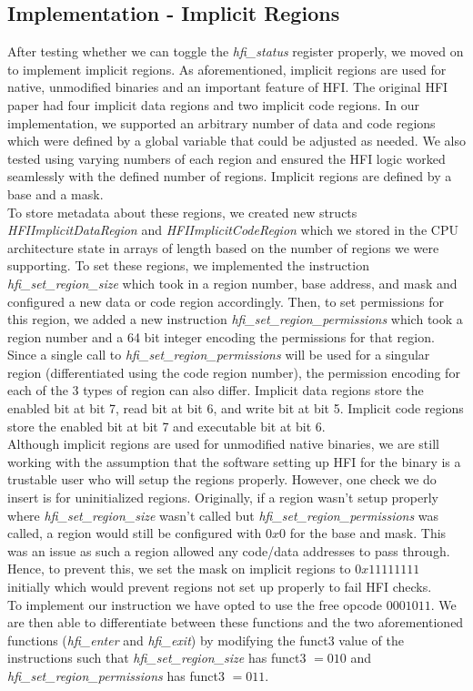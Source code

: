 \documentclass[conference,compsoc]{IEEEtran}
\begin{document}
\subsection{Implementation - Implicit Regions}
After testing whether we can toggle the \textit{hfi\_status} register properly, we moved on to implement implicit regions. As aforementioned, implicit regions are used for native, unmodified binaries and an important feature of HFI. The original HFI paper had four implicit data regions and two implicit code regions. In our implementation, we supported an arbitrary number of data and code regions which were defined by a global variable that could be adjusted as needed. We also tested using varying numbers of each region and ensured the HFI logic worked seamlessly with the defined number of regions. Implicit regions are defined by a base and a mask.\\
To store metadata about these regions, we created new structs \textit{HFIImplicitDataRegion} and \textit{HFIImplicitCodeRegion} which we stored in the CPU architecture state in arrays of length based on the number of regions we were supporting. To set these regions, we implemented the instruction \textit{hfi\_set\_region\_size} which took in a region number, base address, and mask and configured a new data or code region accordingly. Then, to set permissions for this region, we added a new instruction \textit{hfi\_set\_region\_permissions} which took a region number and a 64 bit integer encoding the permissions for that region. Since a single call to \textit{hfi\_set\_region\_permissions} will be used for a singular region (differentiated using the code region number), the permission encoding for each of the 3 types of region can also differ. Implicit data regions store the enabled bit at bit 7, read bit at bit 6, and write bit at bit 5. Implicit code regions store the enabled bit at bit 7 and executable bit at bit 6.\\
Although implicit regions are used for unmodified native binaries, we are still working with the assumption that the software setting up HFI for the binary is a trustable user who will setup the regions properly. However, one check we do insert is for uninitialized regions. Originally, if a region wasn't setup properly where \textit{hfi\_set\_region\_size} wasn't called but \textit{hfi\_set\_region\_permissions} was called, a region would still be configured with $0x0$ for the base and mask. This was an issue as such a region allowed any code/data addresses to pass through. Hence, to prevent this, we set the mask on implicit regions to $0x11111111$ initially which would prevent regions not set up properly to fail HFI checks.\\
To implement our instruction we have opted to use the free opcode $0001011$.
We are then able to differentiate between these functions and the two aforementioned functions (\textit{hfi\_enter} and \textit{hfi\_exit}) by modifying the funct3 value of the instructions such that \textit{hfi\_set\_region\_size} has funct3 $= 010$ and \textit{hfi\_set\_region\_permissions} has funct3 $= 011$.
\end{document}
